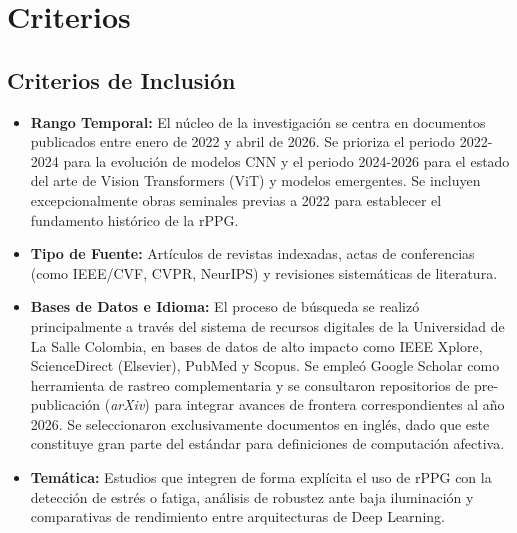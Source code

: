 \section{Criterios}
\subsection{Criterios de Inclusión}
\begin{itemize}
    \item \textbf{Rango Temporal:} El núcleo de la investigación se centra en documentos publicados entre enero de 2022 y abril de 2026. Se prioriza el periodo 
    2022-2024 para la evolución de modelos CNN y el periodo 2024-2026 para el estado del arte de Vision Transformers (ViT) y modelos emergentes. 
    Se incluyen excepcionalmente obras seminales previas a 2022 para establecer el fundamento histórico de la rPPG.
    \item \textbf{Tipo de Fuente:} Artículos de revistas indexadas, actas de conferencias (como IEEE/CVF, CVPR, NeurIPS) y revisiones sistemáticas de literatura.
    \item \textbf{Bases de Datos e Idioma:} El proceso de búsqueda se realizó principalmente a través del sistema de recursos digitales de la Universidad de 
    La Salle Colombia, en bases de datos de alto impacto como IEEE Xplore, ScienceDirect (Elsevier), PubMed y Scopus. Se empleó Google Scholar como herramienta 
    de rastreo complementaria y se consultaron repositorios de pre-publicación (\textit{arXiv}) para integrar avances de frontera correspondientes al año 2026. 
    Se seleccionaron exclusivamente documentos en inglés, dado que este constituye gran parte del estándar para definiciones de computación afectiva.
    \item \textbf{Temática:} Estudios que integren de forma explícita el uso de rPPG con la detección de estrés o fatiga, análisis de robustez ante 
    baja iluminación y comparativas de rendimiento entre arquitecturas de Deep Learning.
\end{itemize}

